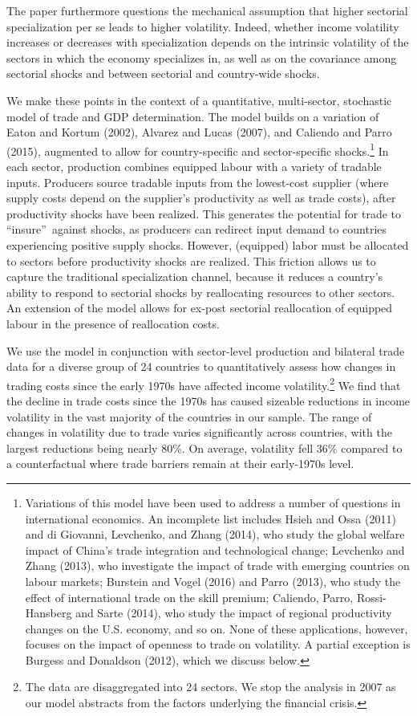 \documentclass[12pt]{article}
\begin{document}
The paper furthermore questions the mechanical assumption that higher
sectorial specialization per se leads to higher volatility. Indeed, whether
income volatility increases or decreases with specialization depends on the
intrinsic volatility of the sectors in which the economy specializes in, as
well as on the covariance among sectorial shocks and between sectorial and
country-wide shocks.

We make these points in the context of a quantitative, multi-sector,
stochastic model of trade and GDP determination. The model builds on a
variation of Eaton and Kortum (2002), Alvarez and Lucas (2007), and Caliendo
and Parro (2015), augmented to allow for country-specific and
sector-specific shocks.\footnote{\label{FTlit}Variations of this model have
been used to address a number of questions in international economics. An
incomplete list includes Hsieh and Ossa (2011) and di Giovanni, Levchenko,
and Zhang (2014), who study the global welfare impact of China's trade
integration and technological change; Levchenko and Zhang (2013), who
investigate the impact of trade with emerging countries on labour markets;
Burstein and Vogel (2016) and Parro (2013), who study the effect of
international trade on the skill premium; Caliendo, Parro, Rossi-Hansberg
and Sarte (2014), who study the impact of regional productivity changes on
the U.S. economy, and so on. None of these applications, however, focuses on
the impact of openness to trade on volatility. A partial exception is
Burgess and Donaldson (2012), which we discuss below.} In each sector,
production combines equipped labour with a variety of tradable inputs.
Producers source tradable inputs from the lowest-cost supplier (where supply
costs depend on the supplier's productivity as well as trade costs), after
productivity shocks have been realized. This generates the potential for
trade to \textquotedblleft insure\textquotedblright\ against shocks, as
producers can redirect input demand to countries experiencing positive
supply shocks. However, (equipped) labor must be allocated to sectors before
productivity shocks are realized. This friction allows us to capture the
traditional specialization channel, because it reduces a country's ability
to respond to sectorial shocks by reallocating resources to other sectors.
An extension of the model allows for ex-post sectorial reallocation of
equipped labour in the presence of reallocation costs.

We use the model in conjunction with sector-level production and bilateral
trade data for a diverse group of 24 countries to quantitatively assess how
changes in trading costs since the early 1970s have affected income
volatility.\footnote{%
The data are disaggregated into 24 sectors. We stop the analysis in 2007 as
our model abstracts from the factors underlying the financial crisis.} We
find that the decline in trade costs since the 1970s has caused sizeable
reductions in income volatility in the vast majority of the
countries in our sample. The range of changes in volatility due to trade
varies significantly across countries, with the largest reductions being
nearly 80\%. On average, volatility fell 36\% compared to a counterfactual
where trade barriers remain at their early-1970s level.
\end{document}
